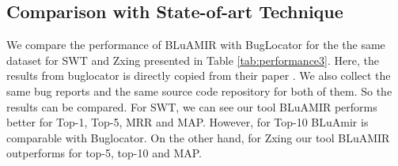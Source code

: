 \documentclass[conference]{IEEEtran}
\begin{document}
\subsection{Comparison with State-of-art Technique}
We compare the performance of BLuAMIR with BugLocator for the the same dataset for SWT and Zxing presented in Table \ref{tab:performance3}. Here, the results from buglocator is directly copied from their paper \cite{Jian}. We also collect the same bug reports and the same source code repository for both of them. So the results can be compared. For SWT, we can see our tool BLuAMIR performs better for Top-1, Top-5, MRR and MAP. However, for Top-10 BLuAmir is comparable with Buglocator. On the other hand, for Zxing our tool BLuAMIR outperforms for top-5, top-10 and MAP. 
\begin{table}[htbp]
	\centering
	\caption{Performance Comparison between BugLocator and BLuAMIR}
	\label{tab:performance3}
\end{table}
\end{document}
